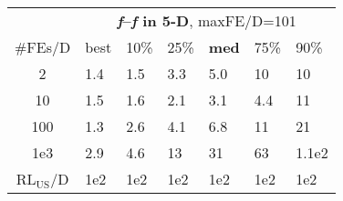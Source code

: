 \begin{tabular}{c|llllll}
 & \multicolumn{6}{|c}{\textbf{\textit{f}\raisebox{-0.35ex}{1}--\textit{f}\raisebox{-0.35ex}{24} in 5-D}, maxFE/D=101}\\
\#FEs/D & best & 10\% & 25\% & \textbf{med} & 75\% & 90\%\\
2 & \hspace*{1ex}1.4 & \hspace*{1ex}1.5 & \hspace*{1ex}3.3 & \hspace*{1ex}5.0 & 10 & 10\\
10 & \hspace*{1ex}1.5 & \hspace*{1ex}1.6 & \hspace*{1ex}2.1 & \hspace*{1ex}3.1 & \hspace*{1ex}4.4 & 11\\
100 & \hspace*{1ex}1.3 & \hspace*{1ex}2.6 & \hspace*{1ex}4.1 & \hspace*{1ex}6.8 & 11 & 21\\
1e3 & \hspace*{1ex}2.9 & \hspace*{1ex}4.6 & 13 & 31 & 63 & 1.1e2\\
$\text{RL}_{\text{US}}$/D & 1e2 & 1e2 & 1e2 & 1e2 & 1e2 & 1e2
\end{tabular}
